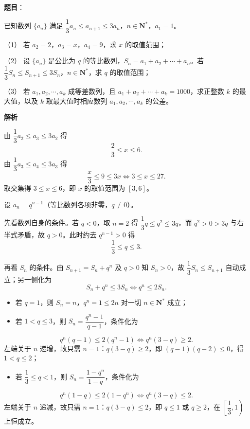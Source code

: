 \begin{answer}

\textbf{题目}：

已知数列 $\{a_n\}$ 满足 $\dfrac13a_n\leqslant a_{n+1}\leqslant3a_n$，$n\in\mathbf N^*$，$a_1=1$。

（1） 若 $a_2=2$，$a_3=x$，$a_4=9$，求 $x$ 的取值范围；

（2） 设 $\{a_n\}$ 是公比为 $q$ 的等比数列，$S_n=a_1+a_2+\cdots+a_n$。若 $\dfrac13S_n\leqslant S_{n+1}\leqslant3S_n$，$n\in\mathbf N^*$，求 $q$ 的取值范围；

（3） 若 $a_1,a_2,\cdots,a_k$ 成等差数列，且 $a_1+a_2+\cdots+a_k=1000$，求正整数 $k$ 的最大值，以及 $k$ 取最大值时相应数列 $a_1,a_2,\cdots,a_k$ 的公差。

\textbf{解析}


由 $\dfrac13a_2\leqslant a_3\leqslant3a_2$ 得
\nopagebreak[4]
\[\frac23\leqslant x\leqslant6 .\]
由 $\dfrac13a_3\leqslant a_4\leqslant3a_3$ 得
\nopagebreak[4]
\[\frac x3\leqslant9\leqslant3x\iff3\leqslant x\leqslant27 .\]
取交集得 $3\leqslant x\leqslant6$，即 $x$ 的取值范围为 $[3,6]$。


设 $a_n=q^{n-1}$（等比数列各项非零，$q\neq0$）。

先看数列自身的条件。若 $q<0$，取 $n=2$ 得 $\dfrac13q\leqslant q^2\leqslant3q$，而 $q^2>0>3q$ 与右半式矛盾，故 $q>0$。此时约去 $q^{n-1}>0$ 得
\nopagebreak[4]
\[\frac13\leqslant q\leqslant3 .\]

再看 $S_n$ 的条件。由 $S_{n+1}=S_n+q^n$ 及 $q>0$ 知 $S_n>0$，故 $\dfrac13S_n\leqslant S_{n+1}$ 自动成立；另一侧化为
\nopagebreak[4]
\[S_n+q^n\leqslant3S_n\iff q^n\leqslant2S_n .\]

\begin{itemize}
\item 若 $q=1$，则 $S_n=n$，$q^n=1\leqslant2n$ 对一切 $n\in\mathbf N^*$ 成立；
\item 若 $1<q\leqslant3$，则 $S_n=\dfrac{q^n-1}{q-1}$，条件化为
\end{itemize}
\nopagebreak[4]
\[q^n(q-1)\leqslant2(q^n-1)\iff q^n(3-q)\geqslant2 .\]
左端关于 $n$ 递增，故只需 $n=1$：$q(3-q)\geqslant2$，即 $(q-1)(q-2)\leqslant0$，得 $1<q\leqslant2$；
\begin{itemize}
\item 若 $\dfrac13\leqslant q<1$，则 $S_n=\dfrac{1-q^n}{1-q}$，条件化为
\end{itemize}
\nopagebreak[4]
\[q^n(1-q)\leqslant2(1-q^n)\iff q^n(3-q)\leqslant2 .\]
左端关于 $n$ 递减，故只需 $n=1$：$q(3-q)\leqslant2$，即 $q\leqslant1$ 或 $q\geqslant2$，在 $\left[\dfrac13,1\right)$ 上恒成立。


\end{answer}
